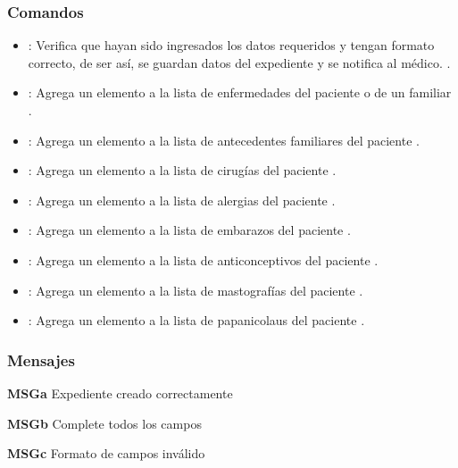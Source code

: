 \subsubsection{Comandos}
\begin{itemize}
	\item {}:  Verifica que hayan sido ingresados los datos requeridos y tengan formato correcto, de ser así, se guardan datos del expediente y se notifica al médico.  .	
	\item {}:  Agrega un elemento a la lista de enfermedades del paciente o de un familiar .  \IUref	
	\item {}:  Agrega un elemento a la lista de antecedentes familiares del paciente .
	\item {}:  Agrega un elemento a la lista de cirugías del paciente .
	\item {}:  Agrega un elemento a la lista de alergias del paciente .
	\item {}:  Agrega un elemento a la lista de embarazos del paciente .
	\item {}:  Agrega un elemento a la lista de anticonceptivos del paciente .
	\item {}:  Agrega un elemento a la lista de mastografías del paciente .
	\item {}:  Agrega un elemento a la lista de papanicolaus del paciente .
\end{itemize}

\subsubsection{Mensajes}
\begin{Citemize}
	\item {\bf MSGa} Expediente creado correctamente
	\item {\bf MSGb} Complete todos los campos
	\item {\bf MSGc} Formato de campos inválido
\end{Citemize}

